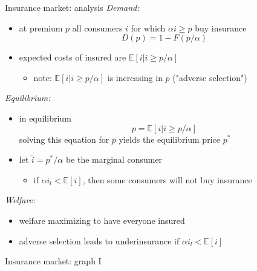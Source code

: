 \documentclass[bigger]{beamer}
\begin{document}
\begin{frame}[label={sec:org0eb87dc}]{Insurance market: analysis}
\emph{Demand:}
\begin{itemize}
\item at premium \(p\) all consumers \(i\) for which \(\alpha i\geq p\) buy insurance
$$D(p)=1-F(p/\alpha)$$
\item expected costs of insured are \(\mathbb{E}[i|i\geq p/\alpha]\)
\begin{itemize}
\item note: \(\mathbb{E}[i|i\geq p/\alpha]\) is increasing in \(p\) ("adverse selection")
\end{itemize}
\end{itemize}

\emph{Equilibrium:}
\begin{itemize}
\item in equilibrium
$$p=\mathbb{E}[i|i\geq p/\alpha]$$
solving this equation for \(p\) yields the equilibrium price \(p^*\)

\item let \(\hat i=p^*/\alpha\) be the marginal consumer
\begin{itemize}
\item if \(\alpha i_l<\mathbb{E}[i]\), then some consumers will not buy insurance
\end{itemize}
\end{itemize}


\emph{Welfare:}
\begin{itemize}
\item welfare maximizing to have everyone insured
\item adverse selection leads to underinsurance if \(\alpha i_l<\mathbb{E}[i]\)
\end{itemize}
\end{frame}
\begin{frame}[label={sec:org3aaa6e5}]{Insurance market: graph I}
\begin{figure}[h]
\centering
{}
%
\end{figure}
\end{frame}
\end{document}
